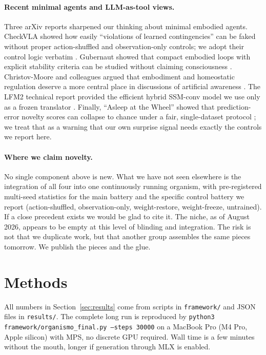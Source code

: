 \documentclass[11pt,a4paper]{article}
\begin{document}
\paragraph{Recent minimal agents and LLM-as-tool views.} Three arXiv reports sharpened our thinking about minimal embodied agents. CheckVLA showed how easily ``violations of learned contingencies'' can be faked without proper action-shuffled and observation-only controls; we adopt their control logic verbatim \cite{checkvla2026}. Gubernaut showed that compact embodied loops with explicit stability criteria can be studied without claiming consciousness \cite{gubernaut2026}. Christov-Moore and colleagues argued that embodiment and homeostatic regulation deserve a more central place in discussions of artificial awareness \cite{christovmoore2025}. The LFM2 technical report provided the efficient hybrid SSM-conv model we use only as a frozen translator \cite{lfm2025}. Finally, ``Asleep at the Wheel'' showed that prediction-error novelty scores can collapse to chance under a fair, single-dataset protocol \cite{probe2026}; we treat that as a warning that our own surprise signal needs exactly the controls we report here.

\paragraph{Where we claim novelty.} No single component above is new. What we have not seen elsewhere is the integration of all four into one continuously running organism, with pre-registered multi-seed statistics for the main battery and the specific control battery we report (action-shuffled, observation-only, weight-restore, weight-freeze, untrained). If a close precedent exists we would be glad to cite it. The niche, as of August 2026, appears to be empty at this level of blinding and integration. The risk is not that we duplicate work, but that another group assembles the same pieces tomorrow. We publish the pieces and the glue.

\section{Methods}
\label{sec:methods}

All numbers in Section~\ref{sec:results} come from scripts in \texttt{framework/} and JSON files in \texttt{results/}. The complete long run is reproduced by \texttt{python3 framework/organismo\_final.py --steps 30000} on a MacBook Pro (M4 Pro, Apple silicon) with MPS, no discrete GPU required. Wall time is a few minutes without the mouth, longer if generation through MLX is enabled.
\end{document}

